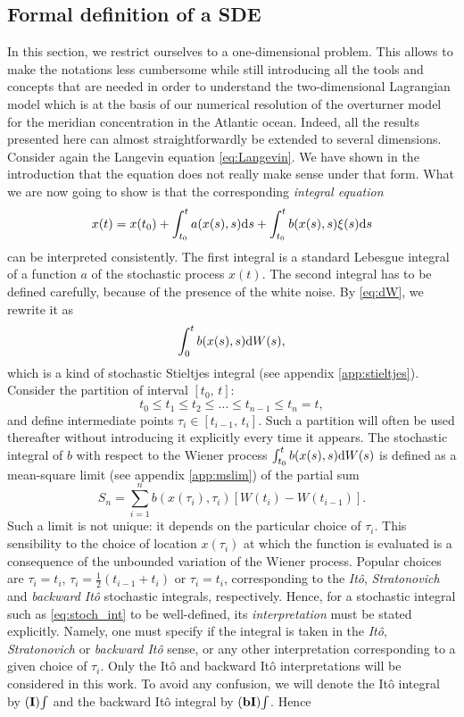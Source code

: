 \subsection{Formal definition of a SDE}
In this section, we restrict ourselves to a one-dimensional problem. This allows to make the notations less cumbersome while still introducing all the tools and concepts that are needed in order to understand the two-dimensional Lagrangian model which is at the basis of our numerical resolution of the overturner model for the meridian concentration in the Atlantic ocean. Indeed, all the results presented here can almost straightforwardly be extended to several dimensions. Consider again the Langevin equation \eqref{eq:Langevin}. We have shown in the introduction that the equation does not really make sense under that form. What we are now going to show is that the corresponding \textit{integral equation} 
\begin{equation} \label{eq:SDEint_xsi}
	x(t) = x(t_0) + \int_{t_0}^t a(x(s),s) \rm ds + \int_{t_0}^t b(x(s),s) \xi(s) \rm ds
\end{equation}
can be interpreted consistently. The first integral is a standard Lebesgue integral of a function $a$ of the stochastic process $x(t)$. The second integral has to be defined carefully, because of the presence of the white noise. By \eqref{eq:dW}, we rewrite it as
\begin{equation} \label{eq:stoch_int}
	\int_0^t b(x(s),s) \rm dW(s),
\end{equation}
which is a kind of stochastic Stieltjes integral (see appendix \ref{app:stieltjes}). Consider the partition of interval $[t_0,\,t]$:
\begin{equation}
	t_0 \le t_1 \le t_2 \le \dots \le t_{n-1} \le t_n = t,
\end{equation}
and define intermediate points $\tau_i \in [t_{i-1},\, t_i]$. Such a partition will often be used thereafter without introducing it explicitly every time it appears. The stochastic integral of $b$ with respect to the Wiener process $\int_{t_0}^t b(x(s),s) \rm dW(s)$ is defined as a mean-square limit (see appendix \ref{app:mslim}) of the partial sum
\begin{equation}
	S_n = \sum_{i=1}^n b(x(\tau_i),\tau_i) [W(t_i)-W(t_{i-1})].
\end{equation}
Such a limit is not unique: it depends on the particular choice of $\tau_i$. This sensibility to the choice of location $x(\tau_i)$ at which the function is evaluated is a consequence of the unbounded variation of the Wiener process. Popular choices are $\tau_i = t_i$, $\tau_i = \frac{1}{2}(t_{i-1}+t_i)$ or $\tau_i = t_i$, corresponding to the \textit{Itô}, \textit{Stratonovich} and \textit{backward Itô} stochastic integrals, respectively. Hence, for a stochastic integral such as \eqref{eq:stoch_int} to be well-defined, its \textit{interpretation} must be stated explicitly. Namely, one must specify if the integral is taken in the \textit{Itô}, \textit{Stratonovich} or \textit{backward Itô} sense, or any other interpretation corresponding to a given choice of $\tau_i$. Only the Itô and backward Itô interpretations will be considered in this work. To avoid any confusion, we will denote the Itô integral by $\I\int$ and the backward Itô integral by $\bI\int$. Hence
